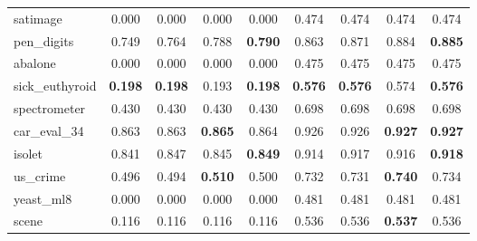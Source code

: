 \begin{figure}[ht]
\begin{tabular}{p{22mm}|*4{p{14mm}}|*4{p{14mm}}}
        satimage&\multicolumn{1}{c}{0.000}&\multicolumn{1}{c}{0.000}&\multicolumn{1}{c}{0.000}&\multicolumn{1}{c|}{0.000}&\multicolumn{1}{c}{0.474}&\multicolumn{1}{c}{0.474}&\multicolumn{1}{c}{0.474}&\multicolumn{1}{c}{0.474}\\
        pen\_digits&\multicolumn{1}{c}{0.749}&\multicolumn{1}{c}{0.764}&\multicolumn{1}{c}{0.788}&\multicolumn{1}{c|}{\textbf{0.790}}&\multicolumn{1}{c}{0.863}&\multicolumn{1}{c}{0.871}&\multicolumn{1}{c}{0.884}&\multicolumn{1}{c}{\textbf{0.885}}\\
        abalone&\multicolumn{1}{c}{0.000}&\multicolumn{1}{c}{0.000}&\multicolumn{1}{c}{0.000}&\multicolumn{1}{c|}{0.000}&\multicolumn{1}{c}{0.475}&\multicolumn{1}{c}{0.475}&\multicolumn{1}{c}{0.475}&\multicolumn{1}{c}{0.475}\\
        sick\_euthyroid&\multicolumn{1}{c}{\textbf{0.198}}&\multicolumn{1}{c}{\textbf{0.198}}&\multicolumn{1}{c}{0.193}&\multicolumn{1}{c|}{\textbf{0.198}}&\multicolumn{1}{c}{\textbf{0.576}}&\multicolumn{1}{c}{\textbf{0.576}}&\multicolumn{1}{c}{0.574}&\multicolumn{1}{c}{\textbf{0.576}}\\
        spectrometer&\multicolumn{1}{c}{0.430}&\multicolumn{1}{c}{0.430}&\multicolumn{1}{c}{0.430}&\multicolumn{1}{c|}{0.430}&\multicolumn{1}{c}{0.698}&\multicolumn{1}{c}{0.698}&\multicolumn{1}{c}{0.698}&\multicolumn{1}{c}{0.698}\\
        car\_eval\_34&\multicolumn{1}{c}{0.863}&\multicolumn{1}{c}{0.863}&\multicolumn{1}{c}{\textbf{0.865}}&\multicolumn{1}{c|}{0.864}&\multicolumn{1}{c}{0.926}&\multicolumn{1}{c}{0.926}&\multicolumn{1}{c}{\textbf{0.927}}&\multicolumn{1}{c}{\textbf{0.927}}\\
        isolet&\multicolumn{1}{c}{0.841}&\multicolumn{1}{c}{0.847}&\multicolumn{1}{c}{0.845}&\multicolumn{1}{c|}{\textbf{0.849}}&\multicolumn{1}{c}{0.914}&\multicolumn{1}{c}{0.917}&\multicolumn{1}{c}{0.916}&\multicolumn{1}{c}{\textbf{0.918}}\\
        us\_crime&\multicolumn{1}{c}{0.496}&\multicolumn{1}{c}{0.494}&\multicolumn{1}{c}{\textbf{0.510}}&\multicolumn{1}{c|}{0.500}&\multicolumn{1}{c}{0.732}&\multicolumn{1}{c}{0.731}&\multicolumn{1}{c}{\textbf{0.740}}&\multicolumn{1}{c}{0.734}\\
        yeast\_ml8&\multicolumn{1}{c}{0.000}&\multicolumn{1}{c}{0.000}&\multicolumn{1}{c}{0.000}&\multicolumn{1}{c|}{0.000}&\multicolumn{1}{c}{0.481}&\multicolumn{1}{c}{0.481}&\multicolumn{1}{c}{0.481}&\multicolumn{1}{c}{0.481}\\
        scene&\multicolumn{1}{c}{0.116}&\multicolumn{1}{c}{0.116}&\multicolumn{1}{c}{0.116}&\multicolumn{1}{c|}{0.116}&\multicolumn{1}{c}{0.536}&\multicolumn{1}{c}{0.536}&\multicolumn{1}{c}{\textbf{0.537}}&\multicolumn{1}{c}{0.536}\\

\end{tabular}
\end{figure}
